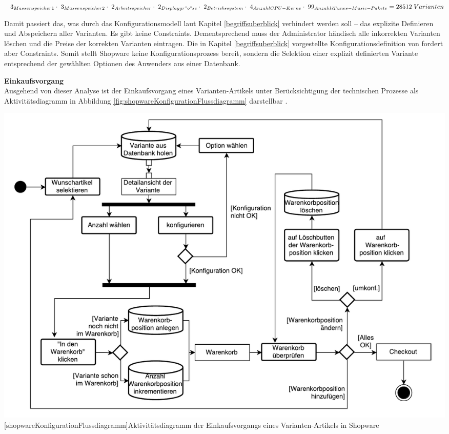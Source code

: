 \documentclass[11pt, a4paper, titlepage, listof=totoc, bibliography=totoc, index=totoc, twoside, openright, headings=normal]{scrreprt}
\begin{document}
\begin{addmargin}[40pt]{0pt} 
$\;\;\;3_{Massenspeicher1}\\\cdot\;3_{Massenspeicher2}\\\cdot\;2_{Arbeitsspeicher}\\\cdot\;2_{Displaygr"o"se}\\\cdot\;2_{Betriebssystem}\\\cdot\;4_{Anzahl CPU-Kerne}\\\cdot\;99_{Anzahl iTunes-Music-Pakete}\\= 28512\;Varianten$
\end{addmargin}

Damit passiert das, was durch das Konfigurationsmodell laut Kapitel \ref{begriffsuberblick} verhindert werden soll -- das explizite Definieren und Abspeichern aller Varianten. Es gibt keine Constraints. Dementsprechend muss der Administrator händisch alle inkorrekten Varianten löschen und die Preise der korrekten Varianten eintragen. Die in Kapitel \ref{begriffsuberblick} vorgestellte Konfigurationsdefinition von \citet{sabin98} fordert aber Constraints. Somit stellt Shopware keine Konfigurationsprozess bereit, sondern die Selektion einer explizit definierten Variante entsprechend der gewählten Optionen des Anwenders aus einer Datenbank.

\textbf{Einkaufsvorgang}\\
Ausgehend von dieser Analyse ist der Einkaufsvorgang eines Varianten-Artikels unter Berücksichtigung der technischen Prozesse als Aktivitätsdiagramm in Abbildung \ref{fig:shopwareKonfigurationFlussdiagramm} darstellbar .

\vspace{1em}
\begin{minipage}{\linewidth}
	\centering
	\includegraphics[width=1\linewidth]{Abbildungen/shopwareKonfigurationFlussdiagramm.pdf}
	[shopwareKonfigurationFlussdiagramm]{Aktivitätsdiagramm der Einkaufsvorgangs eines Varianten-Artikels in Shopware}
	\label{fig:shopwareKonfigurationFlussdiagramm}
\end{minipage}
\vspace{1em}
\end{document}
